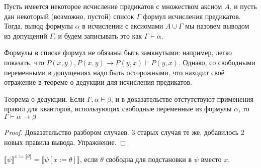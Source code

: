 \begin{definition}Пусть имеется некоторое исчисление предикатов с множеством
аксиом $A$, и пусть дан некоторый (возможно, пустой) список $\Gamma$ 
формул исчисления предикатов. Тогда, вывод формулы $\alpha$
в исчислении с аксиомами $A \cup \Gamma$ мы назовем выводом из 
допущений $\Gamma$, и будем записывать это как $\Gamma \vdash \alpha$.
\end{definition}

Формулы в списке формул не обязаны быть замкнутыми: например, легко 
показать, что $P(x,y), P(x,y)\rightarrow P(y,x) \vdash P(y,x)$. Однако,
со свободными переменными в допущениях надо быть осторожными, что 
находит своё отражение в теореме о дедукции для исчисления предикатов.

\begin{theorem}
Теорема о дедукции. Если $\Gamma, \alpha \vdash \beta$, 
и в доказательстве отстутствуют применения правил для кванторов, использующих
свободные переменные из формулы $\alpha$, то $\Gamma \vdash \alpha \rightarrow \beta$
\end{theorem}

\begin{proof}
Доказательство разбором случаев. 3 старых случая те же, добавилось 
2 новых правила вывода. Упражнение.
\end{proof}

\begin{lemma}\label{free_substitution}
$\llbracket \psi \rrbracket^{x := \llbracket\theta\rrbracket} = \llbracket \psi[x := \theta] \rrbracket$,
если $\theta$ свободна для подстановки в $\psi$ вместо $x$.
\end{lemma}

